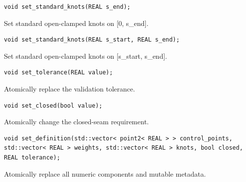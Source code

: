 \par\noindent\begin{minipage}{\linewidth}
\begin{lstlisting}[style=apireference]
void set_standard_knots(REAL s_end);
\end{lstlisting}
{\footnotesize Set standard open-clamped knots on [0, s\_end].\par}
\end{minipage}\par\vspace{1pt}
\par\noindent\begin{minipage}{\linewidth}
\begin{lstlisting}[style=apireference]
void set_standard_knots(REAL s_start, REAL s_end);
\end{lstlisting}
{\footnotesize Set standard open-clamped knots on [s\_start, s\_end].\par}
\end{minipage}\par\vspace{1pt}
\par\noindent\begin{minipage}{\linewidth}
\begin{lstlisting}[style=apireference]
void set_tolerance(REAL value);
\end{lstlisting}
{\footnotesize Atomically replace the validation tolerance.\par}
\end{minipage}\par\vspace{1pt}
\par\noindent\begin{minipage}{\linewidth}
\begin{lstlisting}[style=apireference]
void set_closed(bool value);
\end{lstlisting}
{\footnotesize Atomically change the closed-seam requirement.\par}
\end{minipage}\par\vspace{1pt}
\par\noindent\begin{minipage}{\linewidth}
\begin{lstlisting}[style=apireference]
void set_definition(std::vector< point2< REAL > > control_points, std::vector< REAL > weights, std::vector< REAL > knots, bool closed, REAL tolerance);
\end{lstlisting}
{\footnotesize Atomically replace all numeric components and mutable metadata.\par}
\end{minipage}\par\vspace{1pt}
